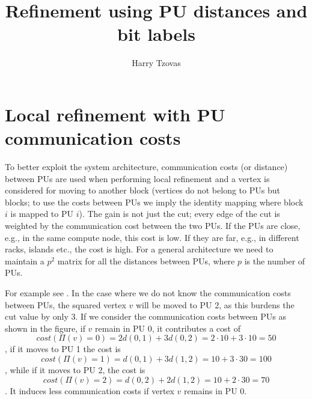 \documentclass[a4paper,10pt]{article}
\author{Harry Tzovas}
\title{Refinement using PU distances and bit labels}
\begin{document}
\maketitle


\section{Local refinement with PU communication costs}

To better exploit the system architecture,
communication costs (or distance) between PUs are used when performing local refinement and a vertex
is considered for moving to another block
(vertices do not belong to PUs but blocks; to use the costs between PUs we imply the
identity mapping where block $i$ is mapped to PU $i$).
The gain is not just the cut; every edge of the cut is weighted by the communication cost 
between the two PUs. If the PUs are close, e.g., in the same compute node, this cost is low. 
If they are far, e.g., in different racks, islands etc., the cost is high.
For a general architecture we need to maintain a $p^2$ matrix for all the distances between PUs,
where $p$ is the number of PUs.

For example see . In the case where we do not know the
communication costs between PUs, the squared vertex $v$ will be moved to PU 2, as this burdens the cut 
value by only 3. If we consider the communication costs between PUs as shown in the figure, 
if $v$ remain in PU 0, it contributes a cost of 
$$
cost(\Pi(v)=0) = 2 d(0,1) + 3 d(0,2)= 2\cdot 10 + 3\cdot 10 = 50
$$,
if it moves to PU 1 the cost is 
$$
cost(\Pi(v)=1) = d(0,1) + 3d(1,2) = 10 + 3\cdot 30= 100
$$,
while if it moves to PU 2, the cost is
$$
cost(\Pi(v)=2) = d(0,2)+ 2d(1,2) = 10 + 2\cdot 30 = 70
$$.
It induces less communication costs if vertex $v$ remains in PU 0.
\end{document}
